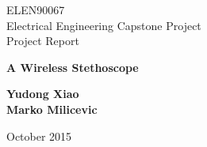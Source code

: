 \documentclass[pdftex, fontsize=11pt, a4paper]{scrbook}
\begin{document}
\begin{titlepage}
\thispagestyle{empty}

\begin{center}
ELEN90067 \\
Electrical Engineering Capstone Project \\
Project Report
\end{center}

\vspace{3cm}

\begin{center}
\Huge{ \bf  A Wireless Stethoscope}
\end{center}

\vspace{2cm}

\begin{center}
\bf{ 
Yudong Xiao \\
Marko Milicevic
}
\end{center}

\vspace{7cm}

\begin{center}
October 2015
\end{center}

\end{titlepage}
\end{document}
